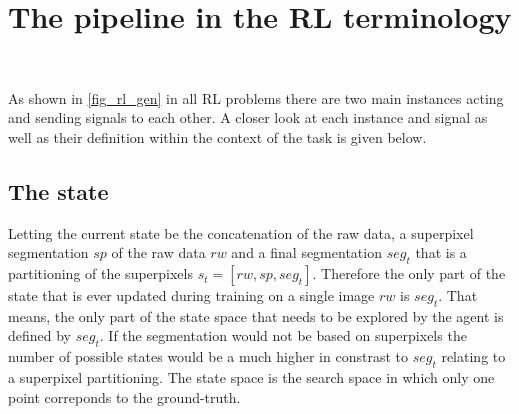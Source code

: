 \section{The pipeline in the RL terminology}~\label{seg:pip_tl_term}

As shown in \ref{fig_rl_gen} in all RL problems there are two main instances acting and sending signals to each other. A closer look at each instance and signal as well as their definition within the context of the task is given below. 

\subsection{The state}
Letting the current state be the concatenation of the raw data, a superpixel segmentation $sp$ of the raw data $rw$ and a final segmentation $seg_t$ that is a partitioning of the superpixels $s_t=\left[ rw, sp, seg_t \right]$. Therefore the only part of the state that is ever updated during training on a single image $rw$ is $seg_t$. That means, the only part of the state space that needs to be explored by the agent is defined by $seg_t$. If the segmentation would not be based on superpixels the number of possible states would be a much higher in constrast to $seg_t$ relating to a superpixel partitioning. The state space is the search space in which only one point correponds to the ground-truth.

